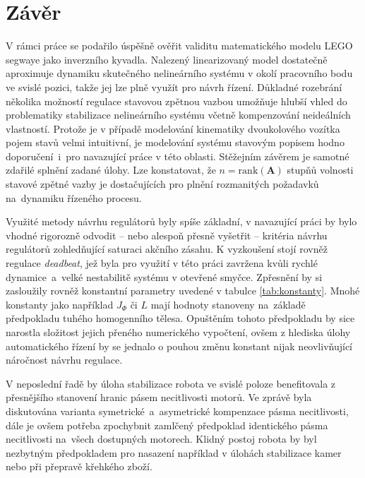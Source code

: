 \documentclass[conference]{IEEEtran}
\begin{document}
\section{Závěr}
V rámci práce se podařilo úspěšně ověřit validitu matematického modelu LEGO segwaye jako inverzního kyvadla.
Nalezený linearizovaný model dostatečně aproximuje dynamiku skutečného nelineárního systému v okolí pracovního bodu ve svislé pozici,
takže jej lze plně využít pro návrh řízení. Důkladné rozebrání několika možností regulace stavovou zpětnou vazbou umožňuje
hlubší vhled do problematiky stabilizace nelineárního systému včetně kompenzování neideálních vlastností.
Protože je v případě modelování kinematiky dvoukolového vozítka pojem stavů velmi intuitivní, je modelování systému stavovým popisem
hodno doporučení~i~pro navazující práce v této oblasti.  Stěžejním závěrem je samotné zdařilé splnění zadané úlohy.
Lze konstatovat, že $n = \text{rank}(\mathbf{A})$ stupňů volnosti stavové zpětné vazby je dostačujících pro plnění rozmanitých požadavků na~dynamiku řízeného procesu.

Využité metody návrhu regulátorů byly spíše základní, v navazující práci by bylo vhodné rigorozně odvodit -- nebo alespoň
přesně vyšetřit -- kritéria návrhu regulátorů zohledňující saturaci akčního zásahu.
K vyzkoušení stojí rovněž regulace \textit{deadbeat}, jež byla pro využití v této práci zavržena kvůli rychlé dynamice~a~velké nestabilitě
systému v otevřené smyčce. Zpřesnění by si zasloužily rovněž konstantní parametry uvedené v tabulce \ref{tab:konstanty}.
Mnohé konstanty jako například $J_\varPhi$ či $L$ mají hodnoty stanoveny na~základě předpokladu tuhého homogenního tělesa.
Opuštěním tohoto předpokladu by sice narostla složitost jejich přeného numerického vypočtení, ovšem z hlediska úlohy automatického řízení
by se jednalo o pouhou změnu konstant nijak neovlivňující náročnost návrhu regulace.

V neposlední řadě by úloha stabilizace robota ve svislé poloze benefitovala z přesnějšího stanovení hranic pásem necitlivosti
motorů. Ve zprávě byla diskutována varianta symetrické~a~asymetrické kompenzace pásma necitlivosti, dále je ovšem potřeba zpochybnit
zamlčený předpoklad identického pásma necitlivosti na~všech dostupných motorech. Klidný postoj robota by byl nezbytným předpokladem
pro nasazení například v úlohách stabilizace kamer nebo při přepravě křehkého zboží.
\end{document}
